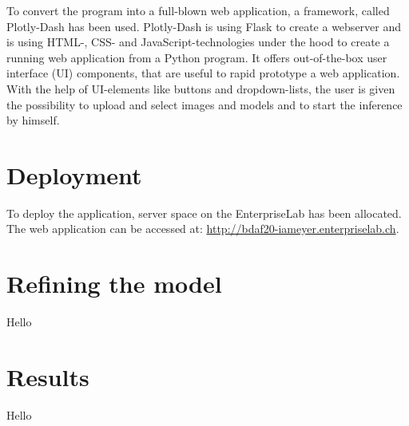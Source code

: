 To convert the program into a full-blown web application, a framework, called Plotly-Dash has been used. Plotly-Dash is using Flask to create a webserver and is using HTML-, CSS- and JavaScript-technologies under the hood to create a running web application from a Python program. It offers out-of-the-box user interface (UI) components, that are useful to rapid prototype a web application. With the help of UI-elements like buttons and dropdown-lists, the user is given the possibility to upload and select images and models and to start the inference by himself.

\section{Deployment}

To deploy the application, server space on the EnterpriseLab has been allocated. The web application can be accessed at: \url{http://bdaf20-iameyer.enterpriselab.ch}.

\section{Refining the model}

Hello

\section{Results}

Hello
